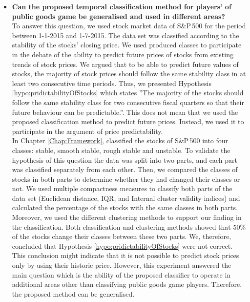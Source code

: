 \begin{itemize}
    \item \textbf{Can the proposed temporal classification method for players' of public goods game be generalised and used in different areas?}\\
    To answer this question, we used stock market data of S\&P\,500 for the period between 1-1-2015 and 1-7-2015. The data set was classified according to the stability of the stocks' closing price. We used produced classes to participate in the debate of the ability to predict future prices of stocks from existing trends of stock prices. We argued that to be able to predict future values of stocks, the majority of stock prices should follow the same stability class in at least two consecutive time periods. Thus, we presented Hypothesis \ref{hypo:pridictabilityOfStocks} which states ''The majority of the stocks should follow the same stability class for two consecutive fiscal quarters so that their future behaviour can be predictable.''. This does not mean that we used the proposed classification method to predict future prices. Instead, we used it to participate in the argument of price predictability.\\
    In Chapter \ref{Chap:Framework}, classified the stocks of S\&P\,500 into four classes: stable, smooth stable, rough stable and unstable. To validate the hypothesis of this question the data was split into two parts, and each part was classified separately from each other. Then, we compared the classes of stocks in both parts to determine whether they had changed their classes or not. We used multiple compactness measures to classify both parts of the data set (Euclidean distance, IQR, and Internal cluster validity indices) and calculated the percentage of the stocks with the same classes in both parts. Moreover, we used the different clustering methods to support our finding in the classification. Both classification and clustering methods showed that 50\% of the stocks change their classes between these two parts. We, therefore, concluded that Hypothesis  \ref{hypo:pridictabilityOfStocks} were not correct. This conclusion might indicate that it is not possible to predict stock prices only by using their historic price. However, this experiment answered the main question which is the ability of the proposed classifier to operate in additional areas other than classifying public goods game players.  Therefore, the proposed method can be generalised.

    
\end{itemize}

